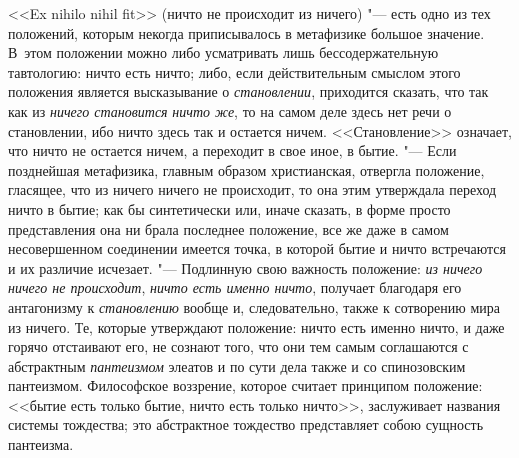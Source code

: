 <<Ex nihilo nihil fit>> (ничто не происходит из ничего) "--- есть одно из тех
положений, которым некогда приписывалось в метафизике большое значение.
В~этом положении можно либо усматривать лишь бессодержательную тавтологию:
ничто есть ничто; либо, если действительным смыслом этого положения
является высказывание о {\em становлении}, приходится
сказать, что так как из {\em ничего становится}
{\em ничто же}, то на самом деле здесь нет речи о
становлении, ибо ничто здесь так и остается ничем. <<Становление>> означает,
что ничто не остается ничем, а переходит в свое иное, в бытие. "--- Если
позднейшая метафизика, главным образом христианская, отвергла положение,
гласящее, что из ничего ничего не происходит, то она этим утверждала
переход ничто в бытие; как бы синтетически или, иначе сказать, в форме
просто представления она ни брала последнее положение, все же даже в самом
несовершенном соединении имеется точка, в которой бытие и ничто встречаются
и их различие исчезает. "--- Подлинную свою важность положение:
{\em из ничего ничего не происходит},
{\em ничто есть именно ничто}, получает благодаря его
антагонизму к {\em становлению} вообще и,
следовательно, также к сотворению мира из ничего. Те, которые утверждают
положение: ничто есть именно ничто, и даже горячо отстаивают его, не
сознают того, что они тем самым соглашаются с абстрактным
{\em пантеизмом} элеатов и по сути дела также и со
спинозовским пантеизмом. Философское воззрение, которое считает принципом
положение: <<бытие есть только бытие, ничто есть только ничто>>, заслуживает
названия системы тождества; это абстрактное тождество представляет собою
сущность пантеизма.

